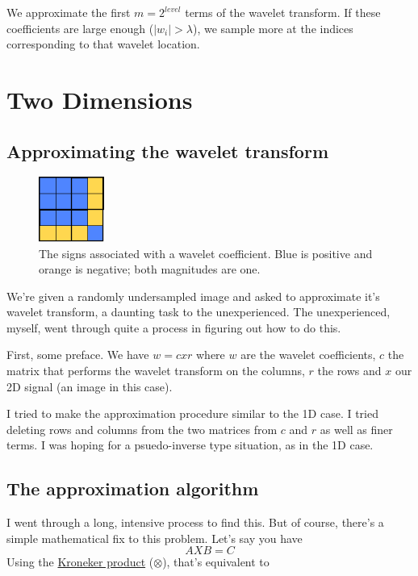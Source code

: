 \documentclass[leqno]{article}
\newcommand{\kron}{http://en.wikipedia.org/wiki/Kronecker\_product\#Matrix\_equations}
\begin{document}
        We approximate the first $m=2^{level}$ terms of the wavelet transform. If these coefficients are large enough ($|w_i|> \lambda$), we sample more at the indices corresponding to that wavelet location.


    \section{Two Dimensions}
        \subsection{Approximating the wavelet transform}
            \begin{figure}
                \begin{center}
                    \includegraphics[width=0.19\textwidth]{signs}
                \end{center}
                \caption{The signs associated with a wavelet coefficient. Blue is positive and orange is negative; both magnitudes are one.  }
                \label{fig:signs}    
            \end{figure}

            We're given a randomly undersampled image and asked to approximate it's wavelet transform, a daunting task to the unexperienced. The unexperienced, myself, went through quite a process in figuring out how to do this. 

            First, some preface. We have $w = c x r$ where $w$ are the wavelet coefficients, $c$ the matrix that performs the wavelet transform on the columns, $r$ the rows and $x$ our 2D signal (an image in this case).

            I tried to make the approximation procedure similar to the 1D case. I tried deleting rows and columns from the two matrices from $c$ and $r$ as well as finer terms. I was hoping for a psuedo-inverse type situation, as in the 1D case.




        \subsection{The approximation algorithm}
            I went through a long, intensive process to find this. But of course, there's a simple mathematical fix to this problem. Let's say you have 
                $$AXB = C$$
                Using the \href{\kron}{Kroneker product} ($\otimes$), that's equivalent to
\end{document}
